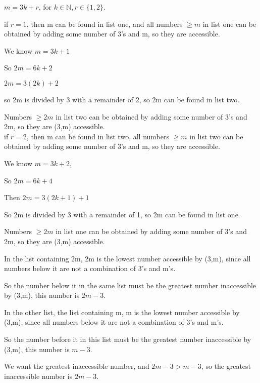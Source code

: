 \documentclass[11pt]{article}
\begin{document}
\begin{enumerate}
$m = 3k + r$, for $k\in\mathbb{N}, r\in\{1,2\}$.

\break
\break
if $r = 1$, then m can be found in list one, and all numbers $\geq m$ in list one can be obtained by adding some number of 3's and m, so they are accessible.

We know $m = 3k +1$

So $2m = 6k + 2$ 

$2m = 3(2k) + 2$

so 2m is divided by 3 with a remainder of 2, so 2m can be found in list two.

Numbers $\geq 2m$ in list two can be obtained by adding some number of 3's and 2m, so they are (3,m) accessible.
\\[0.15in]
if $r = 2$, then m can be found in list two, all numbers $\geq m$ in list two can be obtained by adding some number of 3's and m, so they are accessible.

We know $m = 3k + 2$, 

So $2m = 6k + 4$

Then $2m = 3(2k + 1) + 1$

So 2m is divided by 3 with a remainder of 1, so 2m can be found in list one.

Numbers $\geq 2m$ in list one can be obtained by adding some number of 3's and 2m, so they are (3,m) accessible.

In the list containing 2m, 2m is the lowest number accessible by (3,m), since all numbers below it are not a combination of 3's and m's.


So the number below it in the same list must be the greatest number inaccessible by (3,m), this number is $2m-3$.


In the other list, the list containing m, m is the lowest number accessible by (3,m), since all numbers below it are not a combination of 3's and m's.

So the number before it in this list must be the greatest number inaccessible by (3,m), this number is $m-3$.

We want the greatest inaccessible number, and $2m-3 > m-3$, so the greatest inaccessible number is $2m-3$.
\end{enumerate}
\end{document}
